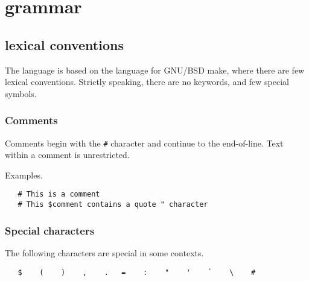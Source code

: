 %
%
\chapter{\OMake{} grammar}
\label{chapter:grammar}

\section{\OMake{} lexical conventions}

The \OMake{} language is based on the language for GNU/BSD make, where there are few lexical
conventions.  Strictly speaking, there are no keywords, and few special symbols.

\subsection{Comments}

Comments begin with the \verb+#+ character and continue to the end-of-line.
Text within a comment is unrestricted.

Examples.

\begin{verbatim}
   # This is a comment
   # This $comment contains a quote " character
\end{verbatim}

\subsection{Special characters}

The following characters are special in some contexts.

\begin{verbatim}
   $    (    )    ,    .   =    :    "    '    `    \    #
\end{verbatim}

